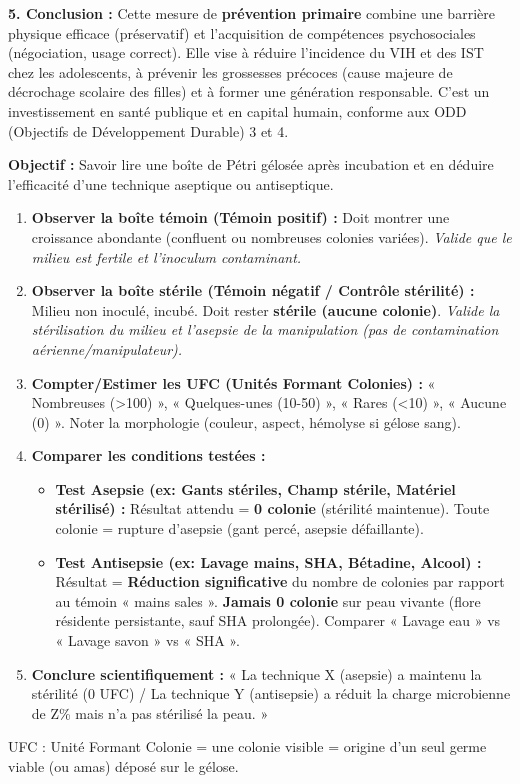 \documentclass[11pt]{article}
\newcommand{\cle}[1]{{\popxbold\color{popdark}#1}}
\begin{document}
\begin{exoresolu}
    \textbf{5. Conclusion :} Cette mesure de \textbf{prévention primaire} combine une barrière physique efficace (préservatif) et l'acquisition de compétences psychosociales (négociation, usage correct). Elle vise à réduire l'incidence du VIH et des IST chez les adolescents, à prévenir les grossesses précoces (cause majeure de décrochage scolaire des filles) et à former une génération responsable. C'est un investissement en santé publique et en capital humain, conforme aux ODD (Objectifs de Développement Durable) 3 et 4.
\end{exoresolu}

\begin{methode}
    \textbf{Objectif :} Savoir lire une boîte de Pétri gélosée après incubation et en déduire l'efficacité d'une technique aseptique ou antiseptique.
    \begin{enumerate}
        \item \textbf{Observer la boîte témoin (Témoin positif) :} Doit montrer une croissance abondante (confluent ou nombreuses colonies variées). \textit{Valide que le milieu est fertile et l'inoculum contaminant.}
        \item \textbf{Observer la boîte stérile (Témoin négatif / Contrôle stérilité) :} Milieu non inoculé, incubé. Doit rester \textbf{stérile (aucune colonie)}. \textit{Valide la stérilisation du milieu et l'asepsie de la manipulation (pas de contamination aérienne/manipulateur).}
        \item \textbf{Compter/Estimer les UFC (Unités Formant Colonies) :} « Nombreuses (>100) », « Quelques-unes (10-50) », « Rares (<10) », « Aucune (0) ». Noter la morphologie (couleur, aspect, hémolyse si gélose sang).
        \item \textbf{Comparer les conditions testées :}
            \begin{itemize}
                \item \textbf{Test Asepsie (ex: Gants stériles, Champ stérile, Matériel stérilisé) :} Résultat attendu = \textbf{0 colonie} (stérilité maintenue). Toute colonie = rupture d'asepsie (gant percé, asepsie défaillante).
                \item \textbf{Test Antisepsie (ex: Lavage mains, SHA, Bétadine, Alcool) :} Résultat = \textbf{Réduction significative} du nombre de colonies par rapport au témoin « mains sales ». \textbf{Jamais 0 colonie} sur peau vivante (flore résidente persistante, sauf SHA prolongée). Comparer « Lavage eau » vs « Lavage savon » vs « SHA ».
            \end{itemize}
        \item \textbf{Conclure scientifiquement :} « La technique X (asepsie) a maintenu la stérilité (0 UFC) / La technique Y (antisepsie) a réduit la charge microbienne de Z\% mais n'a pas stérilisé la peau. »
    \end{enumerate}
    \cle{UFC} : Unité Formant Colonie = une colonie visible = origine d'un seul germe viable (ou amas) déposé sur le gélose.
\end{methode}
\end{document}
